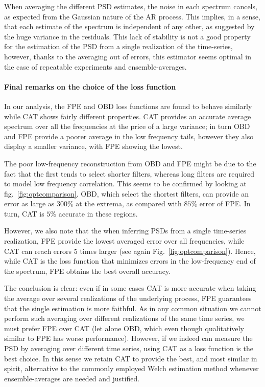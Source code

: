 \documentclass{aa}
\begin{document}
When averaging the different PSD estimates, the noise in each spectrum cancels, as expected from the Gaussian nature of the AR process. 
This implies, in a sense, that each estimate of the spectrum is independent of any other, as suggested by the huge variance in the residuals. This lack of stability is not a good property for the estimation of the PSD from a single realization of the time-series, however, thanks to the averaging out of errors, this estimator seems optimal in the case of repeatable experiments and ensemble-averages.

\paragraph{Final remarks on the choice of the loss function}

In our analysis, the FPE and OBD loss functions are found to behave similarly while CAT shows fairly different properties.
CAT provides an accurate average spectrum over all the frequencies at the price of a large variance; in turn OBD and FPE 
provide a poorer average in the low frequency tails, however they also display a  smaller variance, with FPE showing the lowest.

The poor low-frequency reconstruction from OBD and FPE might be due to the fact that the first tends to select shorter filters, whereas long filters are required to model low frequency correlation.
This seems to be confirmed by looking at fig.~\ref{fig:optcomparison}. OBD, which select the shortest filters, can provide an error as large as $300 \%$ at the extrema, as compared with $85\%$ error of FPE. In turn, CAT is $5\%$ accurate in these regions.

However, we also note that the when inferring PSDs from a single time-series realization, FPE provide the lowest averaged error over all frequencies, while CAT can reach errors $5$ times larger (see again Fig.~\ref{fig:optcomparison}).
Hence, while CAT is the loss function that minimizes errors in the low-frequency end of the spectrum, FPE obtains the best overall accuracy. 

The conclusion is clear: even if in some cases CAT is more accurate when taking the average over several realizations of the underlying process, 
FPE guarantees that the single estimation is more faithful.
As in any common situation we cannot perform such averaging over different realizations of the same time series, we must prefer FPE over CAT (let alone OBD, which even though qualitatively similar to FPE has worse performance).
However, if we indeed can measure the PSD by averaging over different time series, using CAT as a loss function is the best choice. In this sense we retain CAT to provide the best, and most similar in spirit, alternative to the commonly employed Welch estimation method whenever ensemble-averages are needed and justified.
\end{document}
